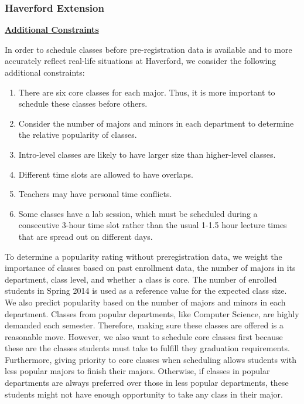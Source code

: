 \documentclass[11pt, oneside]{article}   	%
\begin{document}
\subsubsection{Haverford Extension}
\underline {\textbf{Additional Constraints}}\par
In order to schedule classes before pre-registration data is available and to more accurately reflect real-life situations at Haverford, we consider the following additional constraints:
\begin{enumerate}
\item There are six core classes for each major. Thus, it is more important to schedule these classes before others.
\item Consider the number of majors and minors in each department to determine the relative popularity of classes.
\item Intro-level classes are likely to have larger size than higher-level classes.
\item Different time slots are allowed to have overlaps.
\item Teachers may have personal time conflicts.
\item Some classes have a lab session, which must be scheduled during a consecutive 3-hour time slot rather than the usual 1-1.5 hour lecture times that are spread out on different days.
\end{enumerate}
\par To determine a popularity rating without preregistration data, we weight the importance of classes based on past enrollment data, the number of majors in its department, class level, and whether a class is core. The number of enrolled students in Spring 2014 is used as a reference value for the expected class size. We also predict popularity based on the number of majors and minors in each department. Classes from popular departments, like Computer Science, are highly demanded each semester. Therefore, making sure these classes are offered is a reasonable move. However, we also want to schedule core classes first because these are the classes students must take to fulfill they graduation requirements. Furthermore, giving priority to core classes when scheduling allows students with less popular majors to finish their majors. Otherwise, if classes in popular departments are always preferred over those in less popular departments, these students might not have enough opportunity to take any class in their major. \par
\end{document}
